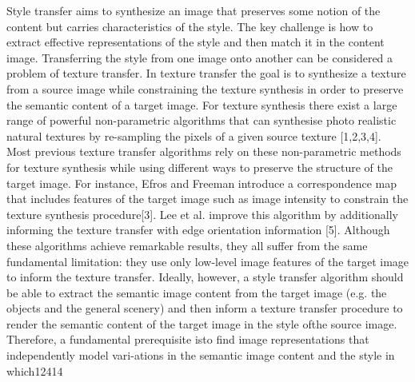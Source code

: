 \begin{Introduction}
	Style transfer aims to synthesize an image that
	preserves some notion of the content but carries characteristics of the style. The key challenge is how to extract effective representations of the style and then match it in the content image.
	Transferring the style from one image onto another can be considered a problem of texture transfer. In texture transfer the goal is to synthesize a texture from a source image while constraining the texture synthesis in order to preserve the semantic content of a target image. For texture synthesis there exist a large range of powerful non-parametric algorithms that can synthesise photo realistic natural textures by re-sampling the pixels of a given source texture [1,2,3,4]. Most previous texture transfer algorithms rely on these non-parametric methods for texture synthesis while using different ways to preserve the structure of the target image. For instance, Efros and Freeman introduce a correspondence map that includes features of the target image such as image intensity to constrain the texture synthesis procedure[3]. Lee et al. improve this algorithm by additionally informing the texture transfer with edge orientation information [5]. Although these algorithms achieve remarkable results, they all suffer from the same fundamental limitation: they use only low-level image features of the target image to inform the texture transfer. Ideally, however, a style transfer algorithm should be able to extract the semantic image content from the target image (e.g. the objects and the general scenery) and then inform a texture transfer procedure to render the semantic content of the target image in the style ofthe source image. Therefore, a fundamental prerequisite isto find image representations that independently model vari-ations in the semantic image content and the style in which12414
	

\end{Introduction}